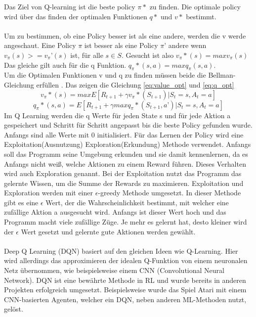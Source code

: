 Das Ziel von Q-learning ist die beste policy $\pi*$ zu finden. Die optimale policy wird über das finden der optimalen Funktionen $q*$ und $v*$ bestimmt. 
\\\\
Um zu bestimmen, ob eine Policy besser ist als eine andere, werden die v werde angeschaut. Eine Policy $\pi$ ist besser als eine Policy $\pi’$ andere wenn $v_\pi(s) >= v_\pi’(s)$ ist, für alle $s \in S$. 
Gesucht ist also $v_\pi*(s) =max v_\pi(s)$
Das gleiche gilt auch für die q Funktion.
$q_\pi*(s,a) = max q_\pi(s,a)$.
\\
Um die Optimalen Funktionen v und q zu finden müssen beide die Bellman-Gleichung erfüllen . Das zeigen die Gleichung \ref{eq:value_opt} und \ref{eq:q_opt}
\begin{equation}\label{eq:value_opt}
v_\pi*(s) = max E[R_{t+1}+ \gamma{}v_\pi*(S_{t+1})|S_t= s, A_t=a]
\end{equation}
\begin{equation}\label{eq:q_opt}
q_\pi*(s,a) = E[R_{t+1} + \gamma{}maxq_\pi*(S_{t+1},a’)|S_t= s, A_t=a] 
\end{equation}
Im Q Learning werden die q Werte für jeden State s und für jede Aktion a gespeichert und Schritt für Schritt angepasst bis die beste Policy gefunden wurde. Anfangs sind alle Werte mit 0 initialisiert.
Für das Lernen der Policy wird eine Exploitation(Ausnutzung) Exploration(Erkundung) Methode verwendet. Anfangs soll das Programm seine Umgebung erkunden und sie damit kennenlernen, da es Anfangs nicht weiß, welche Aktionen zu einem Reward führen. Dieses Verhalten wird auch Exploration genannt. Bei der Exploitation nutzt das Programm das gelernte Wissen, um die Summe der Rewards zu maximieren. 
Exploitation und Exploration werden mit einer $\epsilon$-greedy Methode umgesetzt.
In dieser Methode gibt es eine $\epsilon$ Wert, der die Wahrscheinlichkeit bestimmt, mit welcher eine zufällige Aktion a ausgesucht wird. Anfangs ist dieser Wert hoch und das Programm macht viele zufällige Züge. Je mehr es gelernt hat, desto kleiner wird der $\epsilon$ Wert gesetzt und gelernte gute Aktionen werden gewählt.
\\\\
Deep Q Learning (DQN)  basiert auf den gleichen Ideen wie Q-Learning. Hier wird allerdings das approximieren der idealen Q-Funktion von einem neuronalen Netz übernommen, wie beispielsweise einem CNN (Convolutional Neural Network).
DQN ist eine bewährte Methode in RL und wurde bereits in anderen Projekten erfolgreich umgesetzt. Beispielsweise wurde das Spiel Atari mit einem CNN-basierten Agenten, welcher ein DQN, neben anderen ML-Methoden nutzt, gelöst.  


